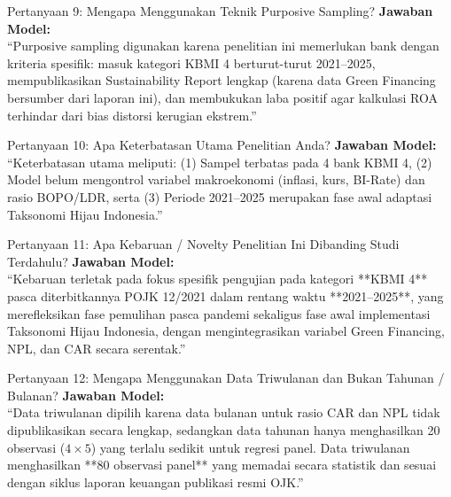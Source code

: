 \documentclass[11pt,a4paper]{article}
\begin{document}
\begin{qnabox}{Pertanyaan 9: Mengapa Menggunakan Teknik Purposive Sampling?}
\textbf{Jawaban Model:}\\
``Purposive sampling digunakan karena penelitian ini memerlukan bank dengan kriteria spesifik: masuk kategori KBMI 4 berturut-turut 2021--2025, mempublikasikan Sustainability Report lengkap (karena data Green Financing bersumber dari laporan ini), dan membukukan laba positif agar kalkulasi ROA terhindar dari bias distorsi kerugian ekstrem.''
\end{qnabox}

\begin{qnabox}{Pertanyaan 10: Apa Keterbatasan Utama Penelitian Anda?}
\textbf{Jawaban Model:}\\
``Keterbatasan utama meliputi: (1) Sampel terbatas pada 4 bank KBMI 4, (2) Model belum mengontrol variabel makroekonomi (inflasi, kurs, BI-Rate) dan rasio BOPO/LDR, serta (3) Periode 2021--2025 merupakan fase awal adaptasi Taksonomi Hijau Indonesia.''
\end{qnabox}

\begin{qnabox}{Pertanyaan 11: Apa Kebaruan / Novelty Penelitian Ini Dibanding Studi Terdahulu?}
\textbf{Jawaban Model:}\\
``Kebaruan terletak pada fokus spesifik pengujian pada kategori **KBMI 4** pasca diterbitkannya POJK 12/2021 dalam rentang waktu **2021--2025**, yang merefleksikan fase pemulihan pasca pandemi sekaligus fase awal implementasi Taksonomi Hijau Indonesia, dengan mengintegrasikan variabel Green Financing, NPL, dan CAR secara serentak.''
\end{qnabox}

\begin{qnabox}{Pertanyaan 12: Mengapa Menggunakan Data Triwulanan dan Bukan Tahunan / Bulanan?}
\textbf{Jawaban Model:}\\
``Data triwulanan dipilih karena data bulanan untuk rasio CAR dan NPL tidak dipublikasikan secara lengkap, sedangkan data tahunan hanya menghasilkan 20 observasi ($4 \times 5$) yang terlalu sedikit untuk regresi panel. Data triwulanan menghasilkan **80 observasi panel** yang memadai secara statistik dan sesuai dengan siklus laporan keuangan publikasi resmi OJK.''
\end{qnabox}

\newpage
\end{document}
